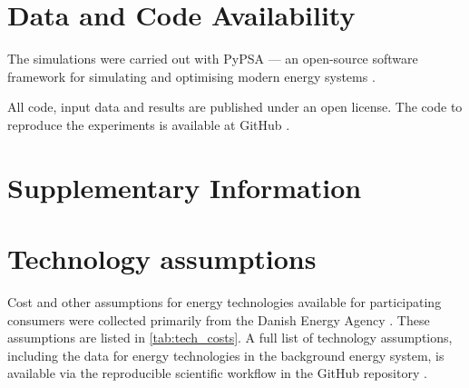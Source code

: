 \documentclass[11pt, 5p, nopreprintline]{elsarticle}
\begin{document}
\section*{Data and Code Availability}
\label{sec:code}

The simulations were carried out with PyPSA --- an open-source software framework for simulating and optimising modern energy systems \cite{brownPyPSAPythonPower2018}.

All code, input data and results are published under an open license. The code to reproduce the experiments is available at GitHub \cite{github-247CFEpaper}.

\printglossary[type=\acronymtype]

\renewcommand{\ttdefault}{\sfdefault}



\newpage

\makeatletter
\renewcommand \thesection{S\@arabic\c@section}
\renewcommand\thetable{S\@arabic\c@table}
\renewcommand \thefigure{S\@arabic\c@figure}
\makeatother
\renewcommand{\citenumfont}[1]{S#1}
\setcounter{equation}{0}
\setcounter{figure}{0}
\setcounter{table}{0}
\setcounter{section}{0}


\section*{Supplementary Information}
\label{sec:si}

\section{Technology assumptions}
\label{sec:si_1}

Cost and other assumptions for energy technologies available for participating consumers were collected primarily from the Danish Energy Agency \cite{DEA-technologydata}. These assumptions are listed in \cref{tab:tech_costs}.
A full list of technology assumptions, including the data for energy technologies in the background energy system, is available via the reproducible scientific workflow in the GitHub repository \cite{github-247CFEpaper}.
\end{document}
